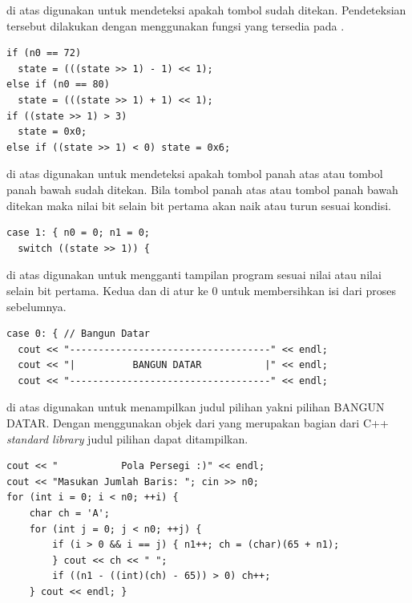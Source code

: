 \documentclass[../main.tex]{subfiles}
\begin{document}
{\Script} di atas digunakan untuk mendeteksi apakah tombol {\enter} sudah ditekan. Pendeteksian tersebut dilakukan dengan menggunakan fungsi  yang tersedia pada {\header} {\file} .

\begin{code}
\begin{verbatim}
if (n0 == 72)
  state = (((state >> 1) - 1) << 1);
else if (n0 == 80)
  state = (((state >> 1) + 1) << 1);
if ((state >> 1) > 3)
  state = 0x0;
else if ((state >> 1) < 0) state = 0x6;
\end{verbatim}
\end{code}

{\Script} di atas digunakan untuk mendeteksi apakah tombol panah atas atau tombol panah bawah sudah ditekan. Bila tombol panah atas atau tombol panah bawah ditekan maka nilai bit selain bit pertama  akan naik atau turun sesuai kondisi.

\begin{code}
\begin{verbatim}
case 1: { n0 = 0; n1 = 0;
  switch ((state >> 1)) {
\end{verbatim}
\end{code}

{\Script} di atas digunakan untuk mengganti tampilan program sesuai nilai  atau nilai  selain bit pertama. Kedua  dan  di atur ke 0 untuk membersihkan isi dari proses sebelumnya.

\begin{code}
\begin{verbatim}
case 0: { // Bangun Datar
  cout << "-----------------------------------" << endl;
  cout << "|          BANGUN DATAR           |" << endl;
  cout << "-----------------------------------" << endl;
\end{verbatim}
\end{code}

{\Script} di atas digunakan untuk menampilkan judul pilihan yakni pilihan BANGUN DATAR. Dengan menggunakan objek  dari {\header} {\file}  yang merupakan bagian dari C++ \textit{standard library} judul pilihan dapat ditampilkan.

\begin{code}
\begin{verbatim}
cout << "           Pola Persegi :)" << endl;
cout << "Masukan Jumlah Baris: "; cin >> n0;
for (int i = 0; i < n0; ++i) {
	char ch = 'A';
	for (int j = 0; j < n0; ++j) {
		if (i > 0 && i == j) { n1++; ch = (char)(65 + n1);
		} cout << ch << " ";
		if ((n1 - ((int)(ch) - 65)) > 0) ch++;
	} cout << endl; }
\end{verbatim}
\end{code}
\end{document}
